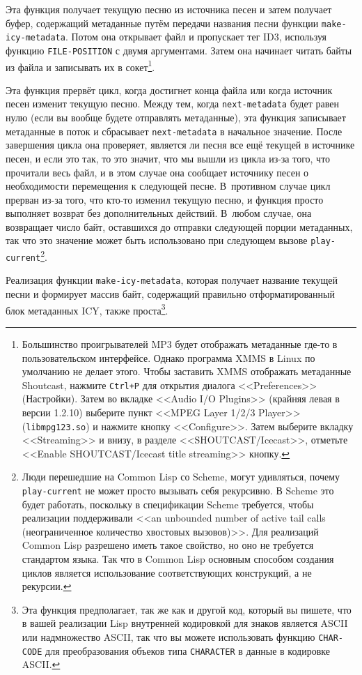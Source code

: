 Эта функция получает текущую песню из источника песен и затем получает буфер, содержащий
метаданные путём передачи названия песни функции \lstinline{make-icy-metadata}.  Потом она
открывает файл и пропускает тег ID3, используя функцию \lstinline{FILE-POSITION} с двумя
аргументами.  Затем она начинает читать байты из файла и записывать их в
сокет\footnote{Большинство проигрывателей MP3 будет отображать метаданные где-то в
  пользовательском интерфейсе.  Однако программа XMMS в Linux по умолчанию не делает
  этого. Чтобы заставить XMMS отображать метаданные Shoutcast, нажмите \lstinline{Ctrl+P} для
  открытия диалога <<Preferences>> (Настройки).  Затем во вкладке <<Audio I/O Plugins>>
  (крайняя левая в версии 1.2.10) выберите пункт <<MPEG Layer 1/2/3 Player>>
  (\lstinline{libmpg123.so}) и нажмите кнопку <<Configure>>.  Затем выберите вкладку
  <<Streaming>> и внизу, в разделе <<SHOUTCAST/Icecast>>, отметьте <<Enable
  SHOUTCAST/Icecast title streaming>> кнопку.}.

Эта функция прервёт цикл, когда достигнет конца файла или когда источник песен изменит
текущую песню.  Между тем, когда \lstinline{next-metadata} будет равен нулю (если вы вообще
будете отправлять метаданные), эта функция записывает метаданные в поток и сбрасывает
\lstinline{next-metadata} в начальное значение.  После завершения цикла она проверяет,
является ли песня все ещё текущей в источнике песен, и если это так, то это значит, что мы
вышли из цикла из-за того, что прочитали весь файл, и в этом случае она сообщает источнику
песен о необходимости перемещения к следующей песне.  В~противном случае цикл прерван
из-за того, что кто-то изменил текущую песню, и функция просто выполняет возврат без
дополнительных действий.  В~любом случае, она возвращает число байт, оставшихся до
отправки следующей порции метаданных, так что это значение может быть использовано при
следующем вызове \lstinline{play-current}\footnote{Люди перешедшие на Common Lisp со Scheme,
  могут удивляться, почему \lstinline{play-current} не может просто вызывать себя рекурсивно.  В
  Scheme это будет работать, поскольку в спецификации Scheme требуется, чтобы реализации
  поддерживали <<an unbounded number of active tail calls (неограниченное количество
  хвостовых вызовов)>>.  Для реализаций Common Lisp разрешено иметь такое свойство, но оно
  не требуется стандартом языка.  Так что в Common Lisp основным способом создания циклов
  является использование соответствующих конструкций, а не рекурсии.}.

Реализация функции \lstinline{make-icy-metadata}, которая получает название текущей песни
и формирует массив байт, содержащий правильно отформатированный блок метаданных ICY, также
проста\footnote{Эта функция предполагает, так же как и другой код, который вы пишете, что
  в вашей реализации Lisp внутренней кодировкой для знаков является ASCII или надмножество
  ASCII, так что вы можете использовать функцию \lstinline{CHAR-CODE} для преобразования
  объеков типа \lstinline{CHARACTER} в данные в кодировке ASCII.}.

